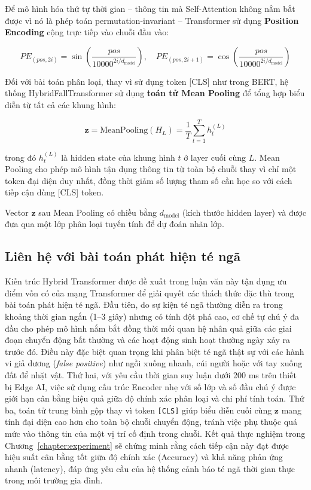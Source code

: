 Để mô hình hóa thứ tự thời gian -- thông tin mà Self-Attention không nắm bắt được vì nó là phép toán permutation-invariant -- Transformer sử dụng \textbf{Position Encoding} cộng trực tiếp vào chuỗi đầu vào:

\begin{equation}
PE_{(pos, 2i)} = \sin\left(\frac{pos}{10000^{2i/d_{\text{model}}}}\right), \quad
PE_{(pos, 2i+1)} = \cos\left(\frac{pos}{10000^{2i/d_{\text{model}}}}\right)
\end{equation}

Đối với bài toán phân loại, thay vì sử dụng token [CLS] như trong BERT, hệ thống HybridFallTransformer sử dụng \textbf{toán tử Mean Pooling} để tổng hợp biểu diễn từ tất cả các khung hình:

\begin{equation}
\mathbf{z} = \text{MeanPooling}(H_L) = \frac{1}{T} \sum_{t=1}^{T} h_t^{(L)}
\end{equation}

trong đó $h_t^{(L)}$ là hidden state của khung hình $t$ ở layer cuối cùng $L$. Mean Pooling cho phép mô hình tận dụng thông tin từ toàn bộ chuỗi thay vì chỉ một token đại diện duy nhất, đồng thời giảm số lượng tham số cần học so với cách tiếp cận dùng [CLS] token.

Vector $\mathbf{z}$ sau Mean Pooling có chiều bằng $d_{\text{model}}$ (kích thước hidden layer) và được đưa qua một lớp phân loại tuyến tính để dự đoán nhãn lớp.

\subsection{Liên hệ với bài toán phát hiện té ngã}
\label{sec:transformer_fall_detection_connection}

Kiến trúc Hybrid Transformer được đề xuất trong luận văn này tận dụng ưu điểm vốn có của mạng Transformer để giải quyết các thách thức đặc thù trong bài toán phát hiện té ngã. Đầu tiên, do sự kiện té ngã thường diễn ra trong khoảng thời gian ngắn (1--3 giây) nhưng có tính đột phá cao, cơ chế tự chú ý đa đầu cho phép mô hình nắm bắt đồng thời mối quan hệ nhân quả giữa các giai đoạn chuyển động bất thường và các hoạt động sinh hoạt thường ngày xảy ra trước đó. Điều này đặc biệt quan trọng khi phân biệt té ngã thật sự với các hành vi giả dương (\textit{false positive}) như ngồi xuống nhanh, cúi người hoặc với tay xuống đất để nhặt vật. Thứ hai, với yêu cầu thời gian suy luận dưới 200 ms trên thiết bị Edge AI, việc sử dụng cấu trúc Encoder nhẹ với số lớp và số đầu chú ý được giới hạn cân bằng hiệu quả giữa độ chính xác phân loại và chi phí tính toán. Thứ ba, toán tử trung bình gộp thay vì token \verb|[CLS]| giúp biểu diễn cuối cùng $\mathbf{z}$ mang tính đại diện cao hơn cho toàn bộ chuỗi chuyển động, tránh việc phụ thuộc quá mức vào thông tin của một vị trí cố định trong chuỗi. Kết quả thực nghiệm trong Chương~\ref{chapter:experiment} sẽ chứng minh rằng cách tiếp cận này đạt được hiệu suất cân bằng tốt giữa độ chính xác (Accuracy) và khả năng phản ứng nhanh (latency), đáp ứng yêu cầu của hệ thống cảnh báo té ngã thời gian thực trong môi trường gia đình.

